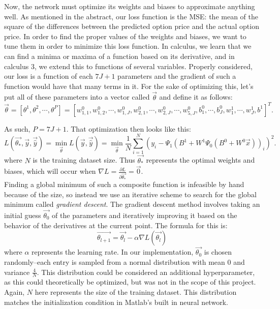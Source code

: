 \documentclass[reqno,14pt]{amsart}
\theoremstyle{plain}
\theoremstyle{definition}
\theoremstyle{remark}
\begin{document}
Now, the network must optimize its weights and biases to approximate anything well. As mentioned in the abstract, our loss function is the MSE: the mean of the square of the differences between the predicted option price and the actual option price. In order to find the proper values of the weights and biases, we want to tune them in order to minimize this loss function. In calculus, we learn that we can find a minima or maxima of a function based on its derivative, and in calculus 3, we extend this to functions of several variables. Properly considered, our loss is a function of each $7J+1$ parameters and the gradient of such a function would have that many terms in it. For the sake of optimizing this, let's put all of these parameters into a vector called $\overrightarrow{\theta}$ and define it as follows:
\begin{equation}
    \overrightarrow{\theta} = [\theta^1, \theta^2, \cdots, \theta^P] = [w^0_{1,1}, w^0_{1,2}, \cdots , w^0_{1,J}, w^0_{2,1}, \cdots , w^0_{2,J}, \cdots , w^0_{5,J}, b^0_1, \cdots , b^0_J, w^1_1, \cdots , w^1_J, b^1]^T.
\end{equation}

As such, $P=7J+1$. That optimization then looks like this:
\begin{equation}
    L(\overrightarrow{\theta_*}, \overrightarrow{y}, \overrightarrow{\hat{y}}) = \min_{\overrightarrow{\theta}} L(\overrightarrow{y}, \overrightarrow{\hat{y}}) = \min_{\overrightarrow{\theta}} \frac{1}{N} \sum_{i=1}^N (y_i - \Psi_1( B^1 + W^1 \Psi_0( B^0 + W^0 \overrightarrow{x} ) )_i)^2.
\end{equation}
where $N$ is the training dataset size. Thus $\overrightarrow{\theta_*}$ represents the optimal weights and biases, which will occur when $\nabla L = \frac{\partial L}{\partial \overrightarrow{\theta_*}} = \vec{0}$.\\

Finding a global minimum of such a composite function is infeasible by hand because of the size, so instead we use an iterative scheme to search for the global minimum called \textit{gradient descent}. The gradient descent method involves taking an initial guess $\overrightarrow{\theta_{0}}$ of the parameters and iteratively improving it based on the behavior of the derivatives at the current point. The formula for this is:
\begin{equation}
    \overrightarrow{\theta_{l+1}} = \overrightarrow{\theta_{l}} - \alpha \nabla L(\overrightarrow{\theta_{l}})
\end{equation}
where $\alpha$ represents the learning rate. In our implementation, $\overrightarrow{\theta_{0}}$ is chosen randomly--each entry is sampled from a normal distribution with mean 0 and variance $\frac{4}{N}$. This distribution could be considered an additional hyperparameter, as this could theoretically be optimized, but was not in the scope of this project. Again, $N$ here represents the size of the training dataset. This distribution matches the initialization condition in Matlab's built in neural network.\\
\end{document}
